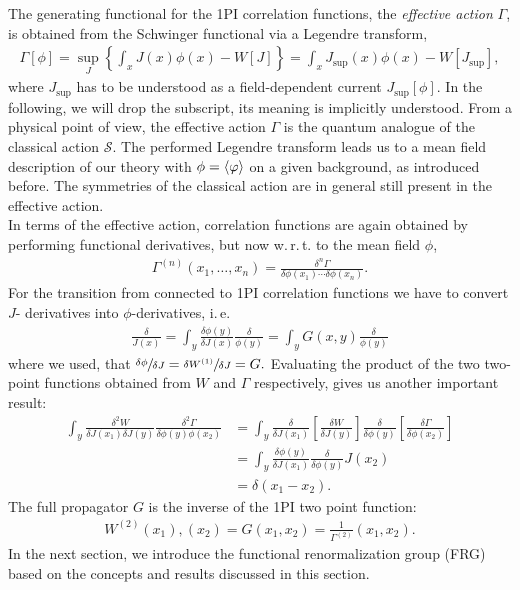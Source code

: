 The generating functional for the  1PI correlation functions, the \textit{effective action} $\Gamma$, is obtained from the Schwinger functional via a Legendre transform, 
\begin{align}
	\Gamma[\phi]=\sup _{J}\left\{\int_{x} J(x) \phi(x)-W[J]\right\}=\int_{x} J_{\mathrm{sup}}(x) \phi(x)-W\left[J_{\mathrm{sup}}\right],
\end{align}
where $J_{\mathrm{sup}}$ has to be understood as a field-dependent current $J_{\mathrm{sup}}[\phi]$. In the following, we will drop the subscript, its meaning is implicitly understood.  From a physical point of view, the effective action $\Gamma$ is the quantum analogue of the classical action $\mathcal{S}$. The performed Legendre transform leads us to a mean field description of our theory with $\phi = \langle \varphi \rangle$ on a given background, as introduced before. The symmetries of the classical action are in general still present in the effective action.\\
In terms of the effective action, correlation functions are again obtained by performing functional derivatives, but now w.\,r.\,t. to the mean field $\phi$,
\begin{align}
	\Gamma^{(n)}\left(x_{1}, \ldots, x_{n}\right)=\frac{\delta^{n} \Gamma}{\delta \phi\left(x_{1}\right) \cdots \delta \phi\left(x_{n}\right)}.
\end{align}
For the transition from connected to 1PI correlation functions we have to convert $J$- derivatives into $\phi$-derivatives, i.\,e.
\begin{align}
	\frac{\delta}{J(x)}=\int_{y} \frac{\delta \phi(y)}{\delta J(x)} \frac{\delta}{\phi(y)}=\int_{y} G(x, y) \frac{\delta}{\phi(y)}
\end{align}
where we used, that $\sfrac{\delta\phi}{\delta J} = \sfrac{\delta W^{(1)}}{\delta J} = G.$ Evaluating the product of the two two-point functions obtained from $W$ and $\Gamma$ respectively, gives us another important result:
\begin{align} \int_{y} \frac{\delta^{2} W}{\delta J\left(x_{1}\right) \delta J(y)} \frac{\delta^{2} \Gamma}{\delta \phi(y) \phi\left(x_{2}\right)} &=\int_{y} \frac{\delta}{\delta J\left(x_{1}\right)}\left[\frac{\delta W}{\delta J(y)}\right] \frac{\delta}{\delta \phi(y)}\left[\frac{\delta \Gamma}{\delta \phi\left(x_{2}\right)}\right] \nonumber\\
&=\int_{y} \frac{\delta \phi(y)}{\delta J\left(x_{1}\right)} \frac{\delta}{\delta \phi(y)} J\left(x_{2}\right) \\ &=\delta\left(x_{1}-x_{2}\right).\nonumber
\end{align} 
The full propagator $G$ is the inverse of the 1PI two point function:
\begin{align}
	W^{(2)}(x_1),(x_2) = G(x_1,x_2) = \frac{1}{\Gamma^{(2)}}(x_1,x_2).
\end{align}
 In the next section, we introduce the functional renormalization group (FRG) based on the concepts and results discussed in this section. 
